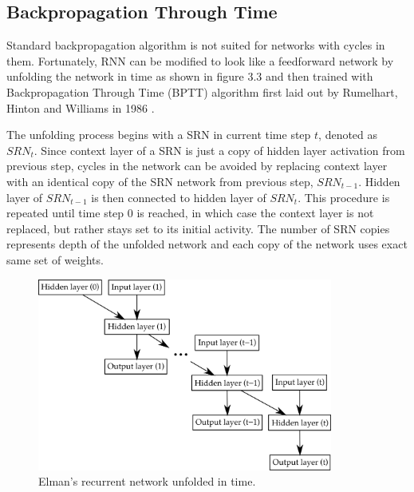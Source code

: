 \documentclass[12pt,oneside]{fithesis2}
\begin{document}
	
\subsection{Backpropagation Through Time}
Standard backpropagation algorithm is not suited for networks with cycles in them. Fortunately, RNN can be modified to look like a feedforward network by unfolding the network in time as shown in figure 3.3 and then trained with Backpropagation Through Time (BPTT) algorithm first laid out by Rumelhart, Hinton and Williams in 1986 \cite{rumelhart-hinton-williams}.\par

The unfolding process begins with a SRN in current time step $t$, denoted as $SRN_t$. Since context layer of a SRN is just a copy of hidden layer activation from previous step, cycles in the network can be avoided by replacing context layer with an identical copy of the SRN network from previous step, $SRN_{t-1}$. Hidden layer of $SRN_{t-1}$ is then connected to hidden layer of $SRN_t$. This procedure is repeated until time step $0$ is reached, in which case the context layer is not replaced, but rather stays set to its initial activity. The number of SRN copies represents depth of the unfolded network and each copy of the network uses exact same set of weights.\par

	\begin{figure}[ht]
		\centering
		\includegraphics[width=367px]{bptt2.png}
		\caption{Elman's recurrent network unfolded in time. }
		\label{fig:bptt}
	\end{figure}
\end{document}
